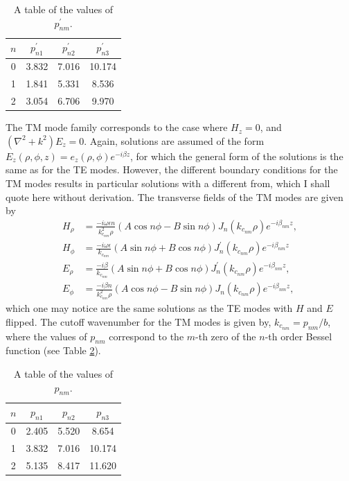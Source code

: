 \begin{table}[htbp]
    \centering
    \caption{\label{tab:chap6-bessel-derivative-roots} A table of the values of $p_{nm}^\prime$.}
    \begin{tabular}{c c c c }
        \hline
        $n$ & $p_{n1}^\prime$ & $p_{n2}^\prime$ & $p_{n3}^\prime$ \\
        \hline
        0 & 3.832 & 7.016 & 10.174\\
        1 & 1.841 & 5.331 & 8.536\\
        2 & 3.054 & 6.706 & 9.970\\
        \hline
    \end{tabular}
\end{table}

The TM mode family corresponds to the case where $H_z=0$, and $(\nabla^2 +k^2)E_z=0$. Again, solutions are assumed of the form $E_z(\rho,\phi,z)=e_z(\rho,\phi)e^{-i\beta z}$, for which the general form of the solutions is the same as for the TE modes. However, the different boundary conditions for the TM modes results in particular solutions with a different from, which I shall quote here without derivation. The transverse fields of the TM modes are given by 
\begin{align}
    H_\rho &=\frac{-i\omega\epsilon n}{k_{c_{nm}}^2 \rho}(A\cos{n\phi}-B\sin{n\phi})J_n(k_{c_{nm}}\rho)e^{-i\beta_{nm} z},\\
    H_\phi &=\frac{-i\omega\epsilon}{k_{c_{nm}}}(A\sin{n\phi}+B\cos{n\phi})J_n^\prime(k_{c_{nm}}\rho)e^{-i\beta_{nm} z}\\
    E_\rho &= \frac{-i\beta }{k_{c_{nm}}}(A\sin{n\phi}+B\cos{n\phi})J_n^\prime(k_{c_{nm}}\rho)e^{-i\beta_{nm} z},\\
    E_\phi &=\frac{-i\beta n}{k_{c_{nm}}^2\rho}(A\cos{n\phi}-B\sin{n\phi})J_n(k_{c_{nm}}\rho)e^{-i\beta_{nm} z},
\end{align}
which one may notice are the same solutions as the TE modes with $H$ and $E$ flipped. The cutoff wavenumber for the TM modes is given by, $k_{c_{nm}}=p_{nm}/b$, where the values of $p_{nm}$ correspond to the $m$-th zero of the $n$-th order Bessel function (see Table \ref{tab:chap6-bessel-roots}).

\begin{table}[htbp]
    \centering
    \caption{\label{tab:chap6-bessel-roots} A table of the values of $p_{nm}$.}
    \begin{tabular}{c c c c }
        \hline
        $n$ & $p_{n1}$ & $p_{n2}$ & $p_{n3}$ \\
        \hline
        0 & 2.405 & 5.520 & 8.654\\
        1 & 3.832 & 7.016 & 10.174\\
        2 & 5.135 & 8.417 & 11.620\\
        \hline
    \end{tabular}
\end{table}

